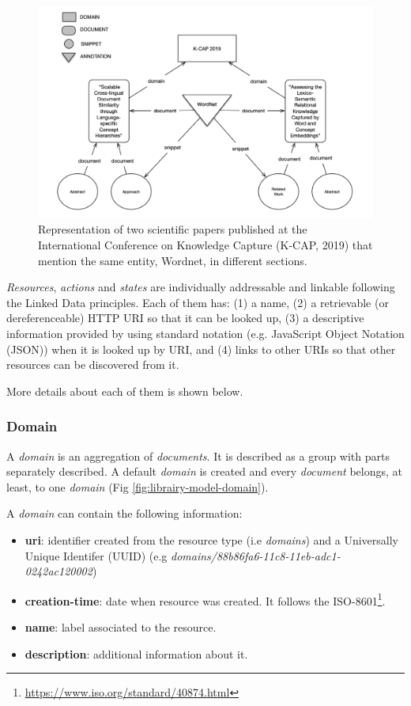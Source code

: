 % 
\begin{figure}
  \center
  \includegraphics[scale=0.55]{model}
  \caption{Representation of two scientific papers published at the International Conference on Knowledge Capture (K-CAP, 2019) that mention the same entity, Wordnet, in different sections.}
  \label{fig:librairy-model}
\end{figure}

\textit{Resources}, \textit{actions} and \textit{states} are individually addressable and linkable \citep{Turchi2012a} following the Linked Data principles\citep{Bizer2009}. Each of them has: (1) a name, (2) a retrievable (or dereferenceable) HTTP URI so that it can be looked up, (3) a descriptive information provided by using standard notation (e.g. JavaScript Object Notation (JSON)) when it is  looked up by URI, and (4) links to other URIs so that other resources can be discovered from it.

More details about each of them is shown below.

\subsubsection{Domain}

A \textit{domain} is an aggregation of \textit{documents}. It is described as a group with parts separately described. A default \textit{domain} is created and every \textit{document} belongs, at least, to one \textit{domain} (Fig \ref{fig:librairy-model-domain}).

A \textit{domain} can contain the following information: 
\begin{itemize}
\item \textbf{uri}: identifier created from the resource type (i.e \textit{domains}) and a Universally Unique Identifer (UUID) (e.g \textit{domains/88b86fa6-11c8-11eb-adc1-0242ac120002})
\item \textbf{creation-time}: date when resource was created. It follows the ISO-8601\footnote{\url{https://www.iso.org/standard/40874.html}}.
\item \textbf{name}: label associated to the resource.
\item \textbf{description}: additional information about it.
\end{itemize}

